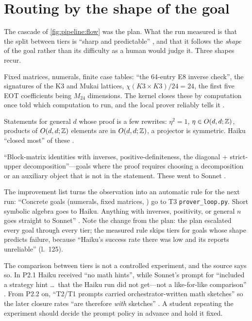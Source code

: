 \section{Routing by the shape of the goal}\label{sec:pipeline:routing}

The cascade of \cref{fig:pipeline:flow} was the plan. What the run measured is that the
split between tiers is ``sharp and predictable'' , and that it
follows the \emph{shape} of the goal rather than its difficulty as a human would judge it.
Three shapes recur.

\begin{description}[leftmargin=*,itemsep=2pt]
\item[Concrete goals.] Fixed matrices, numerals, finite case tables: ``the 64-entry E8
  inverse check'', the signatures of the K3 and Mukai lattices, $\chi(K3\times K3)/24=24$,
  the first five EOT coefficients being $M_{24}$ dimensions. The kernel closes these by
  computation once told which computation to run, and the local prover reliably tells it
  .
\item[Short symbolic algebra.] Statements for general $d$ whose proof is a few rewrites:
  $\eta^2=1$, $\eta\in O(d,d;\mathbb{Z})$, products of $O(d,d;\mathbb{Z})$ elements are in $O(d,d;\mathbb{Z})$, a
  projector is symmetric. Haiku ``closed most'' of these .
\item[Goals needing an idea.] ``Block-matrix identities with inverses,
  positive-definiteness, the diagonal + strict-upper decomposition''---goals where the
  proof requires choosing a decomposition or an auxiliary object that is not in the
  statement. These went to Sonnet .
\end{description}

The improvement list turns the observation into an automatic rule for the next run:
``Concrete goals (numerals, fixed matrices, ) go to T3
\texttt{prover\_loop.py}. Short symbolic algebra goes to Haiku. Anything with inverses,
positivity, or general $n$ goes straight to Sonnet'' .
Note the change from the plan: the plan escalated every goal through every tier; the
measured rule skips tiers for goals whose shape predicts failure, because ``Haiku's success
rate there was low and its reports unreliable'' (l.~125).

\begin{remark}
The comparison between tiers is not a controlled experiment, and the source says so. In
P2.1 Haiku received ``no math hints'', while Sonnet's prompt for
 ``included a strategy hint \ldots\ that the
Haiku run did not get---not a like-for-like comparison'' . From P2.2 on, ``T2/T1 prompts carried orchestrator-written math sketches''
so the later closure rates ``are therefore \emph{with} sketches''
. A student repeating the experiment should
decide the prompt policy in advance and hold it fixed.
\end{remark}


